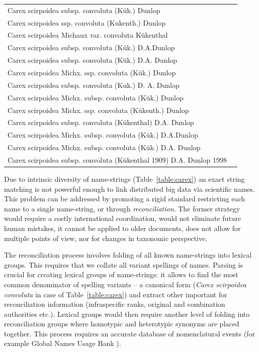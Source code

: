 \documentclass{bmcart}
\begin{document}
\begin{table}[!htb]
\begin{center}
\begin{tabular}{| l | c |}
    Carex scirpoidea subsp. convoluta (Kük.) Dunlop & \\
    Carex scirpoidea ssp. convoluta (Kukenth.) Dunlop & \\
    Carex scirpoidea Michaux var. convoluta Kükenthal & \\
    Carex scirpoidea subsp. convoluta (Kük.) D.A.Dunlop & \\
    Carex scirpoidea subsp. convoluta (Kük.) D.A. Dunlop & \\
    Carex scirpoidea Michx. ssp. convoluta (Kük.) Dunlop & \\
    Carex scirpoidea subsp. convoluta (Kuk.) D. A. Dunlop & \\
    Carex scirpoidea Michx. subsp. convoluta (Kük.) Dunlop & \\
    Carex scirpoidea Michx. ssp. convoluta (Kükenth.) Dunlop & \\
    Carex scirpoidea subsp. convoluta (Kükenthal) D.A. Dunlop & \\
    Carex scirpoidea Michx. subsp. convoluta (Kük.) D.A.Dunlop & \\
    Carex scirpoidea Michx. subsp. convoluta (Kük.) D.A. Dunlop & \\
    Carex scirpoidea subsp. convoluta (Kükenthal 1909) D.A. Dunlop 1998 & \\
    \hline
    \end{tabular}
  \end{center}
\end{table}

Due to intrinsic diversity of name-strings (Table~\ref{table:carex}) an exact
string matching is not powerful enough to link distributed big data via
scientific names. This problem can be addressed by promoting a rigid standard
restricting each name to a single name-string, or through
\textit{reconciliation}. The former strategy would require a costly
international coordination, would not eliminate future human mistakes, it
cannot be applied to older documents, does not allow for multiple points of
view, nor for changes in taxonomic perspective.

The reconciliation process involves folding of all known name-strings into
lexical groups. This requires that we collate all variant spellings of names.
Parsing is crucial for creating lexical groups of name-strings: it allows to
find the most common denominator of spelling variants -- a canonical form
(\textit{Carex scirpoidea convoluta} in case of Table~\ref{table:carex}) and
extract other important for reconciliation  information (infraspecific ranks,
original and combination authorities etc.). Lexical groups would then require
another level of folding into reconciliation groups where homotypic and
heterotypic synonyms are placed together. This process requires an accurate
database of nomenclatural events (for example Global Names Usage Bank
\cite{Pyle2003}).
\end{document}
